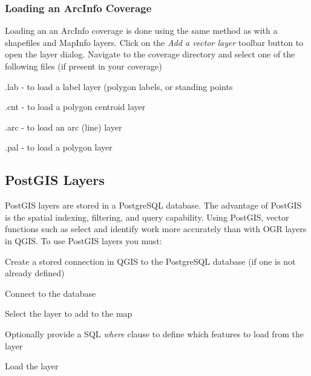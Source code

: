 \documentclass[10pt,english]{article}
\begin{document}
\begin{onehalfspace}
\subsubsection{Loading an ArcInfo Coverage}
Loading an an ArcInfo coverage is done using the same method as with a
shapefiles and MapInfo layers. Click on the \textit{Add a vector layer} toolbar
button to open the layer dialog.  Navigate to the coverage directory and select
one of the following files (if present in your coverage)
\begin{compactenum}
\item .lab - to load a label layer (polygon labels, or standing points
\item .cnt - to load a polygon centroid layer 
\item .arc - to load an arc (line) layer
\item .pal - to load a polygon layer
\end{compactenum}

\subsection{PostGIS Layers}
PostGIS layers are stored in a PostgreSQL database. The advantage of PostGIS is the spatial indexing, filtering, and query capability. Using PostGIS, vector functions such as select and identify work more accurately than with OGR layers in QGIS.
To use PostGIS layers you must:
\begin{compactenum}
\item Create a stored connection in QGIS to the PostgreSQL database (if one is
not already defined)
\item Connect to the database
\item Select the layer to add to the map
\item Optionally provide a SQL \textit{where} clause to define which features to load from the layer
\item Load the layer
\end{compactenum}

\end{onehalfspace}
\end{document}
